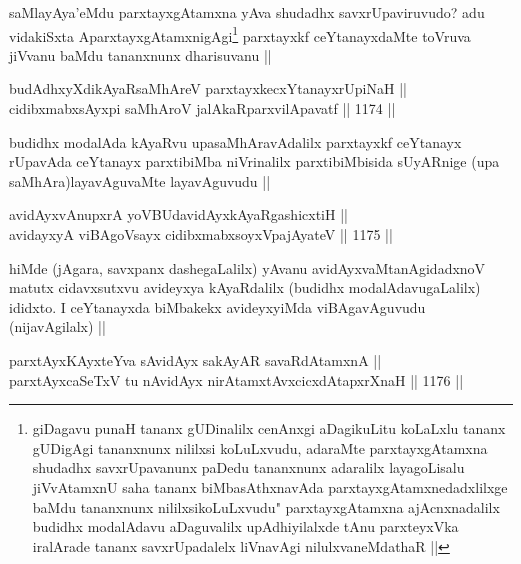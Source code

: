 \begin{artha}
saMlayAya'eMdu parxtayxgAtamxna yAva shudadhx savxrUpaviruvudo? adu vidakiSxta AparxtayxgAtamxnigAgi\footnote{giDagavu punaH tananx gUDinalilx cenAnxgi aDagikuLitu koLaLxlu tananx gUDigAgi tananxnunx nililxsi koLuLxvudu, adaraMte parxtayxgAtamxna shudadhx savxrUpavanunx paDedu tananxnunx adaralilx layagoLisalu jiVvAtamxnU saha tananx biMbasAthxnavAda parxtayxgAtamxnedadxlilxge baMdu tananxnunx nililxsikoLuLxvudu" parxtayxgAtamxna ajAcnxnadalilx budidhx modalAdavu aDaguvalilx upAdhiyilalxde tAnu parxteyxVka iralArade tananx savxrUpadalelx liVnavAgi nilulxvaneMdathaR ||} parxtayxkf ceYtanayxdaMte toVruva jiVvanu baMdu tananxnunx dharisuvanu ||
\end{artha}


\begin{shl}
budAdhxyXdikAyaRsaMhAreV parxtayxkecxYtanayxrUpiNaH || \\
cidibxmabxsAyxpi saMhAroV jalAkaRparxvilApavatf ||  1174 ||  
\end{shl}

\begin{artha}
budidhx modalAda kAyaRvu upasaMhAravAdalilx parxtayxkf ceYtanayx rUpavAda ceYtanayx parxtibiMba niVrinalilx parxtibiMbisida sUyARnige (upa saMhAra)layavAguvaMte layavAguvudu ||
\end{artha}


\begin{shl}
avidAyxvAnupxrA yoV\s BUdavidAyxkAyaRgashicxtiH || \\
avidayxyA viBAgoV\s sayx cidibxmabxsoyxVpajAyateV ||  1175 ||  
\end{shl}

\begin{artha}
hiMde (jAgara, savxpanx dashegaLalilx) yAvanu avidAyxvaMtanAgidadxnoV matutx cidavxsutxvu avideyxya kAyaRdalilx (budidhx modalAdavugaLalilx) ididxto. I ceYtanayxda biMbakekx avideyxyiMda viBAgavAguvudu (nijavAgilalx) ||
\end{artha}

\begin{shl}
parxtAyxKAyxteYva sA\s vidAyx sakAyAR savaRdA\s \s tamxnA || \\
parxtAyxcaSeTxV tu nAvidAyx nirAtamxtAvxcicxdAtapxrXnaH ||  1176 ||  
\end{shl}

